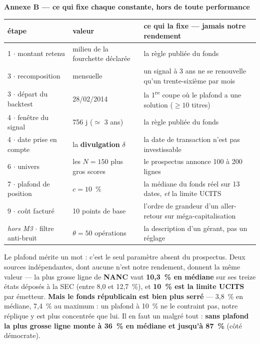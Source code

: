 \documentclass[9pt,a4paper]{extarticle}
\begin{document}
\vspace{0.8mm}
{\color{bleu}\bfseries Annexe B --- ce qui fixe chaque constante, hors de toute performance}\par
\vspace{0.6mm}
{\centering\scriptsize
\begin{tabular}{@{}l l l@{}}
\toprule
\textbf{étape} & \textbf{valeur} & \textbf{ce qui la fixe --- jamais notre rendement} \\
\midrule
1 $\cdot$ montant retenu & milieu de la fourchette déclarée & la règle publiée du fonds \\
3 $\cdot$ recomposition & mensuelle & un signal à 3 ans ne se renouvelle qu'un trente-sixième par mois \\
3 $\cdot$ départ du backtest & 28/02/2014 & la 1\textsuperscript{re} coupe où le plafond a une solution ($\ge10$ titres) \\
4 $\cdot$ fenêtre du signal & 756 j ($\simeq$ 3 ans) & la règle publiée du fonds \\
4 $\cdot$ date prise en compte & la \textbf{divulgation} $\delta$ & la date de transaction n'est pas investissable \\
6 $\cdot$ univers & les $N = 150$ plus gros scores & le prospectus annonce 100 à 200 lignes \\
7 $\cdot$ plafond de position & $c = 10$~\% & la médiane du fonds réel sur 13 dates, \emph{et} la limite UCITS \\
9 $\cdot$ coût facturé & 10 points de base & l'ordre de grandeur d'un aller-retour sur méga-capitalisation \\
\emph{hors M3} $\cdot$ filtre anti-bruit & $\theta = 50$ opérations & la description d'un gérant, pas un réglage \\
\bottomrule
\end{tabular}\par}
\vspace{0.4mm}
{\footnotesize\color{grisf} Le plafond mérite un mot : c'est le seul paramètre absent du prospectus. Deux
sources indépendantes, dont aucune n'est notre rendement, donnent la même valeur --- la plus grosse ligne de
\textbf{NANC} vaut \textbf{10,3~\% en médiane} sur ses treize états déposés à la SEC (entre 8,0 et 12,7~\%),
et \textbf{10~\% est la limite UCITS} par émetteur. \textbf{Mais le fonds républicain est bien plus serré}
--- 3,8~\% en médiane, 7,4~\% au maximum : un plafond à 10~\% ne le contraint pas, notre réplique y est plus
concentrée que lui. Il en faut un malgré tout : \textbf{sans plafond la plus grosse ligne monte à 36~\% en
médiane et jusqu'à 87~\%} (côté démocrate).}\par
\end{document}
